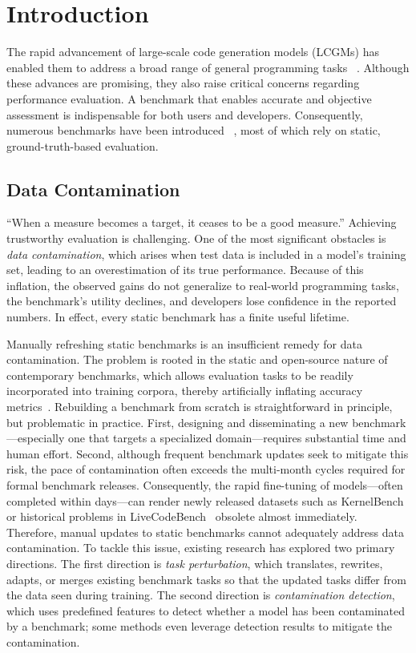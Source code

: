 
\section{Introduction}

The rapid advancement of large-scale code generation models (LCGMs) has enabled them to address a broad range of general programming tasks ~\cite{chen2021evaluating, openai2023gpt4, team2023gemini, touvron2023llama2}. Although these advances are promising, they also raise critical concerns regarding performance evaluation. A benchmark that enables accurate and objective assessment is indispensable for both users and developers. Consequently, numerous benchmarks have been introduced ~\cite{chen2021evaluating, jain2024livecodebench, zhuo2024bigcodebench}, most of which rely on static, ground-truth-based evaluation.

\subsection{Data Contamination}

``When a measure becomes a target, it ceases to be a good measure.'' Achieving trustworthy evaluation is challenging. One of the most significant obstacles is \emph{data contamination}, which arises when test data is included in a model's training set, leading to an overestimation of its true performance. Because of this inflation, the observed gains do not generalize to real-world programming tasks, the benchmark's utility declines, and developers lose confidence in the reported numbers. In effect, every static benchmark has a finite useful lifetime.

Manually refreshing static benchmarks is an insufficient remedy for data contamination. The problem is rooted in the static and open-source nature of contemporary benchmarks, which allows evaluation tasks to be readily incorporated into training corpora, thereby artificially inflating accuracy metrics~\cite{yang2023rethinking}. Rebuilding a benchmark from scratch is straightforward in principle, but problematic in practice. First, designing and disseminating a new benchmark---especially one that targets a specialized domain---requires substantial time and human effort. Second, although frequent benchmark updates seek to mitigate this risk, the pace of contamination often exceeds the multi-month cycles required for formal benchmark releases. Consequently, the rapid fine-tuning of models---often completed within days---can render newly released datasets such as KernelBench~\cite{lange2025robustagenticcudakernel} or historical problems in LiveCodeBench~\cite{jain2024livecodebench} obsolete almost immediately. Therefore, manual updates to static benchmarks cannot adequately address data contamination.
To tackle this issue, existing research has explored two primary directions. The first direction is \emph{task perturbation}, which translates, rewrites, adapts, or merges existing benchmark tasks so that the updated tasks differ from the data seen during training. The second direction is \emph{contamination detection}, which uses predefined features to detect whether a model has been contaminated by a benchmark; some methods even leverage detection results to mitigate the contamination.

